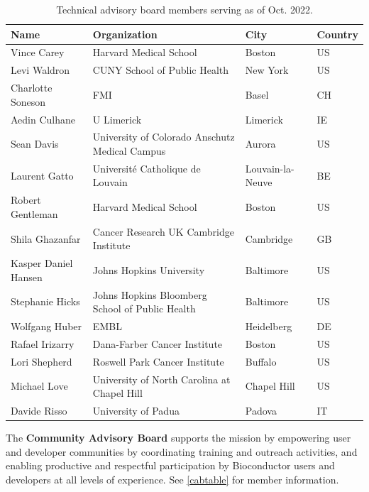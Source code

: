 \documentclass[letterpaper]{article}
\begin{document}
\begin{table}[ht]
\label{tabtable}
\caption{Technical advisory board members serving as of Oct. 2022.}
\centering
\begin{tabular}{llll}
  \hline
 Name & Organization & City & Country \\ 
  \hline
 Vince Carey & Harvard Medical School & Boston & US \\ 
 Levi Waldron & CUNY School of Public Health & New York & US \\ 
 Charlotte Soneson & FMI & Basel & CH \\ 
 Aedin Culhane & U Limerick & Limerick & IE \\ 
 Sean Davis & University of Colorado Anschutz Medical Campus & Aurora & US \\ 
 Laurent Gatto & Université Catholique de Louvain & Louvain-la-Neuve & BE \\ 
 Robert Gentleman & Harvard Medical School & Boston & US \\ 
 Shila Ghazanfar & Cancer Research UK Cambridge Institute & Cambridge & GB \\ 
 Kasper Daniel Hansen & Johns Hopkins University & Baltimore & US \\ 
 Stephanie Hicks & Johns Hopkins Bloomberg School of Public Health & Baltimore & US \\ 
 Wolfgang Huber & EMBL & Heidelberg & DE \\ 
 Rafael Irizarry & Dana-Farber Cancer Institute & Boston &  US \\ 
 Lori Shepherd & Roswell Park Cancer Institute & Buffalo & US \\ 
 Michael Love & University of North Carolina at Chapel Hill & Chapel Hill & US \\ 
 Davide Risso & University of Padua & Padova & IT \\ 
   \hline
\end{tabular}
\end{table}


The \textbf{Community Advisory Board} supports the
\Bioconductor{} mission by empowering user and developer communities
by coordinating training and outreach activities, and enabling
productive and respectful participation by Bioconductor users and
developers at all levels of experience.  See \ref{cabtable} for
member information.
\end{document}
